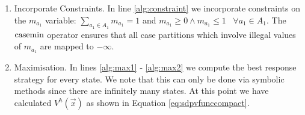 \begin{enumerate}
  \item Incorporate Constraints. 
            In line \ref{alg:constraint} we incorporate constraints on the $m_{a_{1}}$ variable: 
            $\sum_{a_{1} \in A_1} m_{a_{1}} = 1$ and 
            $m_{a_{1}} \geq 0 \wedge m_{a_{1}} \leq 1 \hspace{10pt} \forall a_{1} \in A_1 $.
            The $\mathrm{casemin}$ operator ensures that all case partitions which 
            involve illegal values of $m_{a_{1}}$ are mapped to $-\infty$.
  \item Maximisation. 
            In lines \ref{alg:max1} - \ref{alg:max2} we compute the best response
            strategy for every state. We note that this can only be done
            via symbolic methods since there are infinitely many states. At 
            this point we have calculated $V^{h}(\vec{x})$ as shown in 
            Equation \eqref{eq:sdpvfunccompact}.
\end{enumerate}

